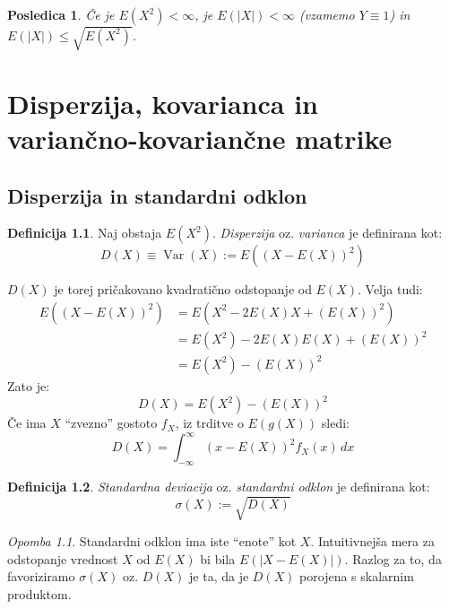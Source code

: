 \documentclass[12pt]{book}
\def\n{\noindent}
\theoremstyle{definition}
\newtheorem{definicija}{Definicija}
\theoremstyle{plain}
\theoremstyle{plain}
\theoremstyle{plain}
\newtheorem{posledica}{Posledica}
\theoremstyle{remark}
\newtheorem*{opomba}{Opomba}
\begin{document}
\begin{posledica}
    Če je $E\left(X^2\right)<\infty$, je $E(|X|)<\infty$ (vzamemo $Y \equiv 1$) in $E(|X|) \leq \sqrt{E\left(X^2\right)}$. 
\end{posledica}

\chapter[Disperzija, kovarianca in variančno-kovariančne matrike]{Disperzija, kovarianca in \\ variančno-kovariančne matrike}

\section{Disperzija in standardni odklon}

\begin{definicija}
    Naj obstaja $E\left(X^2\right)$. \emph{Disperzija} oz. \emph{varianca} je definirana kot:
    $$
    D(X) \equiv \operatorname{Var}(X):=E\left((X-E(X))^2\right)
    $$    
\end{definicija}

\n $D(X)$ je torej pričakovano kvadratično odstopanje od $E(X)$. Velja tudi: 
$$
\begin{aligned}
    E\left((X-E(X))^2\right)&=E\left(X^2-2 E(X) X+(E(X))^2\right) \\
    &=E\left(X^2\right)-2 E(X) E(X)+(E(X))^2 \\
    &=E\left(X^2\right)-(E(X))^2
\end{aligned}
$$
Zato je: 
$$
D(X)=E\left(X^2\right)-\left(E(X)\right)^2
$$
Če ima $X$ “zvezno” gostoto $f_X$, iz trditve o $E(g(X))$ sledi: 
$$
D(X)=\int_{-\infty}^{\infty}(x-E(X))^2 f_X(x) \, d x
$$

\begin{definicija}
    \emph{Standardna deviacija} oz. \emph{standardni odklon} je definirana kot: 
    $$
    \sigma(X):=\sqrt{D(X)}
    $$    
\end{definicija}

\begin{opomba}
    Standardni odklon ima iste “enote” kot $X$. Intuitivnejša mera za odstopanje vrednost $X$ od $E(X)$ bi bila $E(|X-E(X)|)$. Razlog za to, da favoriziramo $\sigma(X)$ oz. $D(X)$ je ta, da je $D(X)$ porojena s skalarnim produktom. 
\end{opomba}
\end{document}
